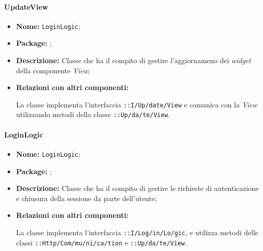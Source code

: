 \paragraph{UpdateView}
\begin{flushleft}
\begin{itemize}
\item \textbf{Nome:} \texttt{LoginLogic};
\item \textbf{Package:} \texttt{\logicUser{}};
\item \textbf{Descrizione:} Classe che ha il compito di gestire l'aggiornameno dei \textit{widget} della componente \textit{View};
\item \textbf{Relazioni con altri componenti:}
\begin{sloppypar}
La classe implementa l'interfaccia \texttt{\iLogicUser{}::I\fshyp{}Up\fshyp{}date\fshyp{}View} e comunica con la \textit{View} utilizzando metodi della classe \texttt{\viewUser{}::Up\fshyp{}da\fshyp{}te\fshyp{}View}.
\end{sloppypar}
\end{itemize}
\end{flushleft}

\paragraph{LoginLogic}
\begin{flushleft}
\begin{itemize}
\item \textbf{Nome:} \texttt{LoginLogic};
\item \textbf{Package:} \texttt{\logicUser{}};
\item \textbf{Descrizione:} Classe che ha il compito di gestire le richieste di autenticazione e chiusura della sessione da parte dell'utente;
\item \textbf{Relazioni con altri componenti:}
\begin{sloppypar}
La classe implementa l'interfaccia \texttt{\iLogicUser{}::I\fshyp{}Log\fshyp{}in\fshyp{}Lo\fshyp{}gic}, e utilizza metodi delle classi \texttt{\serverCommunication{}::Http\fshyp{}Com\fshyp{}mu\fshyp{}ni\fshyp{}ca\fshyp{}tion} e \texttt{\logicUser{}::Up\fshyp{}da\fshyp{}te\fshyp{}View}.
\end{sloppypar}
\end{itemize}
\end{flushleft}

